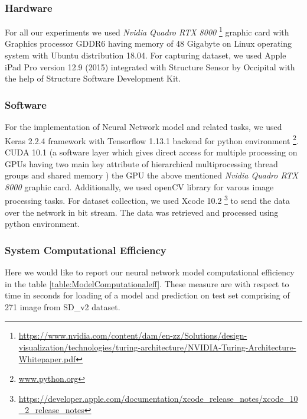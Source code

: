 \subsubsection{Hardware} 
\label{Chapter4:Hardware_i}
For all our experiments we used \textit{Nvidia Quadro RTX 8000} \footnote{\url{https://www.nvidia.com/content/dam/en-zz/Solutions/design-visualization/technologies/turing-architecture/NVIDIA-Turing-Architecture-Whitepaper.pdf}} graphic card with Graphics processor GDDR6  having memory of 48 Gigabyte on Linux operating system with Ubuntu distribution 18.04. For capturing dataset, we used Apple iPad Pro version 12.9 (2015) integrated with Structure Sensor by Occipital with the help of Structure Software Development Kit.


\subsubsection{Software} 
\label{Chapter4:Software_i}
For the implementation of Neural Network model and related tasks, we used Keras 2.2.4 framework with Tensorflow 1.13.1 \cite{tensorflow2015-whitepaper} backend for python environment \footnote{\url{www.python.org}}. CUDA 10.1 (a software layer which gives direct access for multiple processing on GPUs having two main key attribute of hierarchical multiprocessing thread groups and shared memory \cite{nickolls2008scalable}) the GPU  the above mentioned  \textit{Nvidia Quadro RTX 8000} graphic card. Additionally, we used openCV library \cite{opencv_library} for varous image processing tasks. For dataset collection, we used Xcode 10.2 \footnote{\url{https://developer.apple.com/documentation/xcode_release_notes/xcode_10_2_release_notes}} to send the data over the network in bit stream. The data was retrieved and processed using python environment.


\subsubsection{System Computational Efficiency}

Here we would like to report our neural network model computational efficiency in the table \ref{table:ModelComputationaleff}. These measure are with respect to time in seconds for loading of a model  and prediction on test set comprising of 271 image from SD\_v2 dataset.

